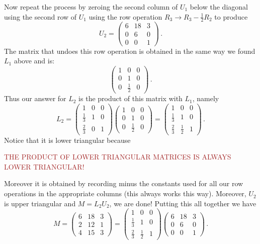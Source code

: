Now repeat the process by zeroing the second column of $U_1$ below the diagonal using the second row of $U_1$ using the row operation
$R_3\to R_3-\frac 12 R_2$ to produce
$$U_2=\begin{pmatrix}6&18&3\\0&6&0\\0&0&1\end{pmatrix}\, .$$
The matrix that undoes this row operation is obtained in the same way we found $L_1$ above and is:
$$
\begin{pmatrix}
1&0&0\\
0&1&0\\
0&\frac 12& 0
\end{pmatrix}\, .
$$
Thus our answer for $L_2$ is the product of this matrix with $L_1$, namely
$$
L_2=
\begin{pmatrix}
1 & 0 & 0 \\[1mm]
\frac{1}{3} & 1 & 0 \\[1mm]
\frac{2}{3} & 0 & 1 
\end{pmatrix}\begin{pmatrix}
1&0&0\\
0&1&0\\
0&\frac 12& 0
\end{pmatrix}
=\begin{pmatrix}
1 & 0 & 0 \\[1mm]
\frac{1}{3} & 1 & 0 \\[1mm]
\frac{2}{3} & \frac{1}{2} & 1 
\end{pmatrix}\, .
$$
Notice that it is lower triangular because 

\begin{center}
\textcolor{brown}{THE PRODUCT OF LOWER TRIANGULAR MATRICES IS ALWAYS LOWER TRIANGULAR!}
\end{center}

\noindent
Moreover it is obtained by recording minus the constants used for all our row operations in the appropriate columns (this always works this way).
Moreover, $U_2$ is upper triangular and $M=L_2U_2$, we are done!
Putting this all together we have
$$M=\begin{pmatrix}
6 & 18 & 3 \\
2 & 12 & 1 \\
4 & 15 & 3 
\end{pmatrix}= \begin{pmatrix}
1 & 0 & 0 \\[1mm]
\frac{1}{3} & 1 & 0 \\[1mm]
\frac{2}{3} & \frac{1}{2} & 1 
\end{pmatrix}\begin{pmatrix}
6 & 18 & 3 \\
0 & 6 & 0 \\
0 & 0 & 1 
\end{pmatrix}\, .$$  

